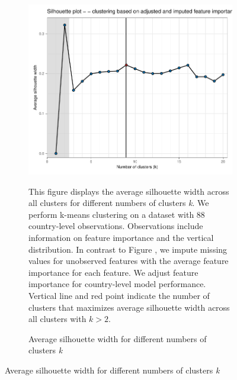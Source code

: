  \begin{figure}[ht!]\ContinuedFloat
   \centering
   \begin{subfigure}[b]{\textwidth}
   \centering
   \includegraphics{Figures_Appendix/Figure_Silhouette_3.pdf}
   \caption{Average silhouette width for different numbers of clusters \textit{k}} \label{fig:G1_silhouette_3}
   \begin{subcaption2}
     This figure displays the average silhouette width across all clusters for different numbers of clusters \textit{k}. We perform k-means clustering on a dataset with 88 country-level observations. Observations include information on feature importance and the vertical distribution. In contrast to Figure , we impute missing values for unobserved features with the average feature importance for each feature. We adjust feature importance for country-level model performance. Vertical line and red point indicate the number of clusters that maximizes average silhouette width across all clusters with $k>2$.
   \end{subcaption2}
   \end{subfigure}
 \end{figure}

 \clearpage

